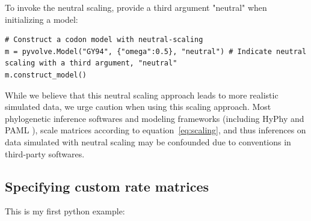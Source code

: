 \documentclass{article}
\newcommand\pythonexternal[2][]{{
		}}
\begin{document}
To invoke the neutral scaling, provide a third argument "neutral" when initializing a model:
\begin{lstlisting}
# Construct a codon model with neutral-scaling
m = pyvolve.Model("GY94", {"omega":0.5}, "neutral") # Indicate neutral scaling with a third argument, "neutral"
m.construct_model()
\end{lstlisting}

While we believe that this neutral scaling approach leads to more realistic simulated data, we urge caution when using this scaling approach. Most phylogenetic inference softwares and modeling frameworks (including HyPhy \citep{HYPHY} and PAML \citep{PAML}), scale matrices according to equation~\ref{eq:scaling}, and thus inferences on data simulated with neutral scaling may be confounded due to conventions in third-party softwares.


\subsection{Specifying custom rate matrices}\label{sec:custom}




\noindent This is my first python example:

\pythonexternal{script.py}














\end{document}
